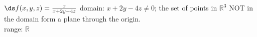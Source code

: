 {$\ds f(x,y,z) = \frac{x}{x+2y-4z}$
}
{domain: $x+2y-4z\neq 0$; the set of points in $\mathbb{R}^3$ NOT in the domain form a plane through the origin.\\
range: $\mathbb{R}$
}